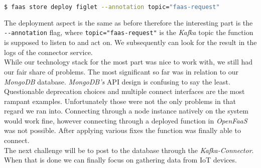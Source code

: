 \documentclass{article}
\begin{document}
  \begin{lstlisting}[language=bash]
    $ faas store deploy figlet --annotation topic="faas-request"
  \end{lstlisting}

  The deployment aspect is the same as before therefore the interesting part is the \texttt{-{}-annotation} flag, where \texttt{topic="faas-request"} is the \textit{Kafka} topic the function is supposed to listen to and act on. We subsequently can look for the result in the logs of the connector service. \\
  While our technology stack for the most part was nice to work with, we still had our fair share of problems. The most significant so far was in relation to our \textit{MongoDB} database. \textit{MongoDB's} API design is confusing to say the least. Questionable deprecation choices and multiple connect interfaces are the most rampant examples. Unfortunately those were not the only problems in that regard we ran into. Connecting through a node instance natively on the system would work fine, however connecting through a deployed function in \textit{OpenFaaS} was not possible. After applying various fixes the function was finally able to connect. \\
  The next challenge will be to post to the database through the \textit{Kafka-Connector}. When that is done we can finally focus on gathering data from IoT devices.
\end{document}
